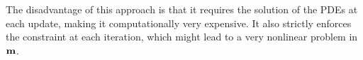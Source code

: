 \documentclass{iopart}
\begin{document}
The disadvantage of this approach is that it
requires the solution of the PDEs at each update, making it computationally very expensive. 
It also strictly enforces the constraint at each iteration, which might lead to a very
nonlinear problem in $\mathbf{m}$. 
% 
\end{document}
